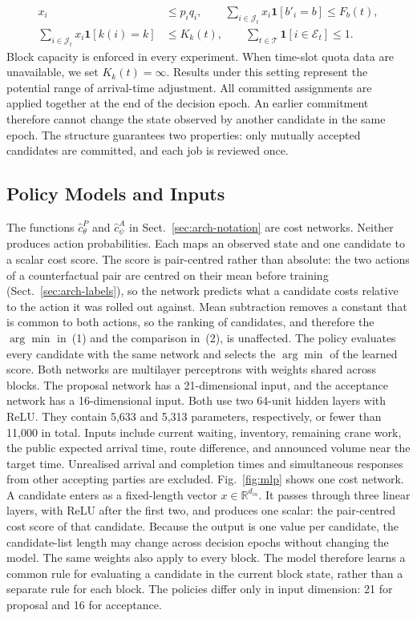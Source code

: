 \begin{equation}
\begin{aligned}
x_i&\le p_iq_i,\qquad
\sum_{i\in\mathcal J_t}\!x_i\mathbf1[b'_i\!=\!b]\le F_b(t),\\
\sum_{i\in\mathcal J_t}\!x_i\mathbf1[k(i)\!=\!k]&\le K_k(t),\qquad
\sum_{t\in\mathcal T}\!\mathbf1[i\in\mathcal E_t]\le1.
\end{aligned}
\end{equation}
Block capacity is enforced in every experiment. When time-slot quota
data are unavailable, we set $K_k(t)=\infty$. Results under this setting
represent the potential range of arrival-time adjustment. All committed
assignments are applied together at the end of the decision epoch. An
earlier commitment therefore cannot change the state observed by another
candidate in the same epoch. The structure guarantees two properties:
only mutually accepted candidates are committed, and each job is
reviewed once.

\subsection{Policy Models and Inputs}
\label{sec:arch-models}
The functions $\hat c^{P}_{\theta}$ and $\hat c^{A}_{\psi}$ in
Sect.~\ref{sec:arch-notation} are cost networks. Neither produces action
probabilities. Each maps an observed state and one candidate to a scalar
cost score. The score is pair-centred rather than absolute: the two
actions of a counterfactual pair are centred on their mean before
training (Sect.~\ref{sec:arch-labels}), so the network predicts what a
candidate costs relative to the action it was rolled out against. Mean
subtraction removes a constant that is common to both actions, so the
ranking of candidates, and therefore the $\arg\min$ in~(1) and the
comparison in~(2), is unaffected. The policy evaluates every candidate
with the same network and selects the $\arg\min$ of the learned score. Both networks are multilayer perceptrons with weights
shared across blocks. The proposal network has a 21-dimensional input,
and the acceptance network has a 16-dimensional input. Both use two
64-unit hidden layers with ReLU. They contain 5{,}633 and 5{,}313
parameters, respectively, or fewer than 11{,}000 in total. Inputs
include current waiting, inventory, remaining crane work, the public
expected arrival time, route difference, and announced volume near the
target time. Unrealised arrival and completion times and simultaneous
responses from other accepting parties are excluded.
Fig.~\ref{fig:mlp} shows one cost network. A candidate enters as a
fixed-length vector $x\in\mathbb R^{d_{in}}$. It passes through three
linear layers, with ReLU after the first two, and produces one scalar:
the pair-centred cost score of that candidate. Because the output is
one value per candidate, the candidate-list length may change across
decision epochs without changing the model. The same weights also apply
to every block. The model therefore learns a common rule for evaluating
a candidate in the current block state, rather than a separate rule for
each block. The policies differ only in input dimension: 21 for proposal
and 16 for acceptance.

